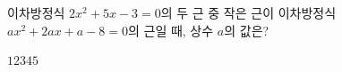 이차방정식 $2x^2+5x-3=0$의 두 근 중 작은 근이 이차방정식 $ax^2+2ax+a-8=0$의 근일 때, 상수 $a$의 값은?
\begin{choices32}{$1$}{$2$}{$3$}{$4$}{$5$}\end{choices32}
